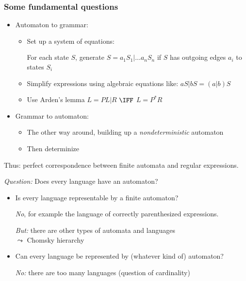 \documentclass{beamer}
\begin{document}
\begin{frame}[fragile]\frametitle{Some fundamental questions}

    \begin{itemize}
    \item Automaton to grammar:
      \begin{itemize}
      \item Set up a system of equations:
        
        For each state $S$, generate $S = a_1 S_1 | \dots a_n S_n$
        if $S$ has outgoing edges $a_i$ to states $S_i$
      
      \item Simplify expressions using algebraic equations like:
        $aS | bS = (a | b) S$
      \item Use Arden's lemma $L = PL | R$ $\IFF$ $L = P^*R$
      \end{itemize}
      
    \item Grammar to automaton:
      \begin{itemize}
      \item The other way around, building up a \emph{nondeterministic} automaton
      \item Then determinize
      \end{itemize}
    \end{itemize}
    Thus: perfect correspondence between finite automata and regular expressions.

    \emph{Question:} Does every language have an automaton?

    \begin{itemize}
    \item Is every language representable by  a finite automaton?

      \emph{No}, for example the language of correctly parenthesized expressions.

      \emph{But:} there are other types of automata and languages\\
      $\leadsto$ Chomsky hierarchy
      
    \item Can every language be represented by (whatever kind of) automaton?

      \emph{No:} there are too many languages (question of cardinality)
    \end{itemize}

\end{frame}
\end{document}
